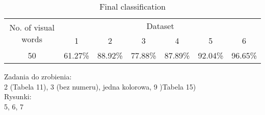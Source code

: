 \documentclass{article}
\begin{document}
\begin{table}
	\centering
		\begin{tabular}{|c|c|c|c|c|c|c|}
		\hline
		\multirow{2}{*}{No. of visual words} & \multicolumn{6}{c|}{Dataset} \\ \cline{2-7}
			& 1 & 2 & 3 & 4 & 5 & 6 \\ \hline
			50 & 61.27\% & 88.92\% &77.88\%& 87.89\%& 92.04\% & 96.65\% \\ \hline
		\end{tabular}
	\caption{Final classification}
	\label{tab:Final}
\end{table}

\beta

Zadania do zrobienia: \\
2 (Tabela 11), 3 (bez numeru), jedna kolorowa, 9 )Tabela 15)\\

Rysunki: \\
5, 6, 7
\end{document}
